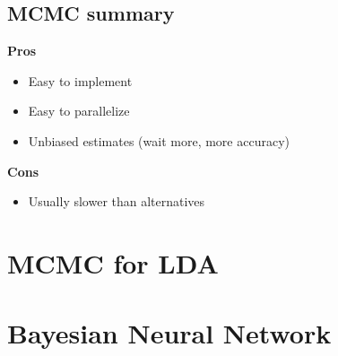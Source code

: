\documentclass[11pt, oneside, reqno]{amsart}
\numberwithin{equation}{section}
\theoremstyle{plain}%
\theoremstyle{definition}
\theoremstyle{remark}
\begin{document}
\subsection{MCMC summary}
\textbf{Pros}
\begin{itemize}
	\item Easy to implement
	\item Easy to parallelize
	\item Unbiased estimates (wait more, more accuracy)
\end{itemize}
\textbf{Cons}
\begin{itemize}
	\item Usually slower than alternatives
\end{itemize}

\section{MCMC for LDA}
\section{Bayesian Neural Network}
 
\end{document}
